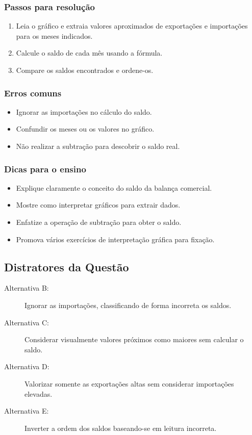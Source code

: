 \documentclass{article}
\begin{document}
\subsubsection*{Passos para resolução}
\begin{enumerate}
  \item Leia o gráfico e extraia valores aproximados de exportações e importações para os meses indicados.
  \item Calcule o saldo de cada mês usando a fórmula.
  \item Compare os saldos encontrados e ordene-os.
\end{enumerate}

\subsubsection*{Erros comuns}
\begin{itemize}
  \item Ignorar as importações no cálculo do saldo.
  \item Confundir os meses ou os valores no gráfico.
  \item Não realizar a subtração para descobrir o saldo real.
\end{itemize}

\subsubsection*{Dicas para o ensino}
\begin{itemize}
  \item Explique claramente o conceito do saldo da balança comercial.
  \item Mostre como interpretar gráficos para extrair dados.
  \item Enfatize a operação de subtração para obter o saldo.
  \item Promova vários exercícios de interpretação gráfica para fixação.
\end{itemize}

\subsection*{Distratores da Questão}
\begin{description}
  \item[Alternativa B:] Ignorar as importações, classificando de forma incorreta os saldos.
  \item[Alternativa C:] Considerar visualmente valores próximos como maiores sem calcular o saldo.
  \item[Alternativa D:] Valorizar somente as exportações altas sem considerar importações elevadas.
  \item[Alternativa E:] Inverter a ordem dos saldos baseando-se em leitura incorreta.
\end{description}
\end{document}
